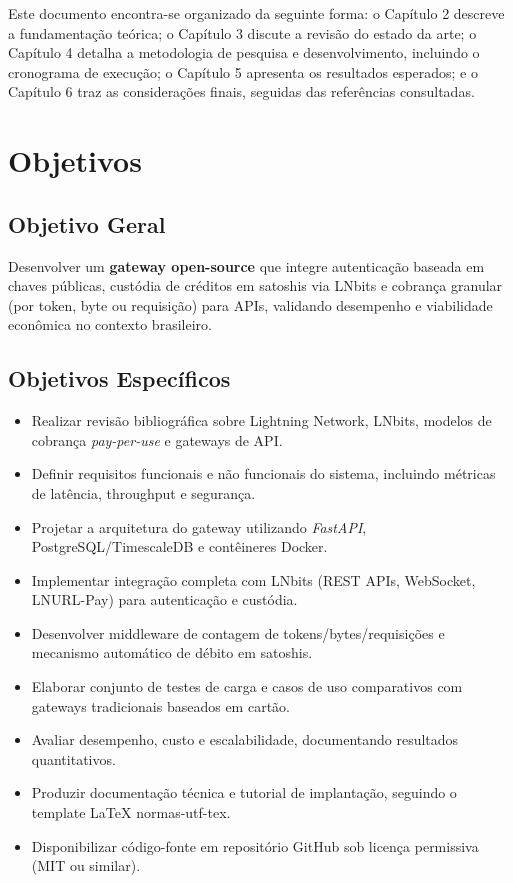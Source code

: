 \documentclass[openright]{normas-utf-tex}
\begin{document}
Este documento encontra-se organizado da seguinte forma: o Capítulo 2 descreve a fundamentação teórica; o Capítulo 3 discute a revisão do estado da arte; o Capítulo 4 detalha a metodologia de pesquisa e desenvolvimento, incluindo o cronograma de execução; o Capítulo 5 apresenta os resultados esperados; e o Capítulo 6 traz as considerações finais, seguidas das referências consultadas.

\section{Objetivos}

\subsection{Objetivo Geral}
Desenvolver um \textbf{gateway open-source} que integre autenticação baseada em chaves públicas, custódia de créditos em satoshis via LNbits e cobrança granular (por token, byte ou requisição) para APIs, validando desempenho e viabilidade econômica no contexto brasileiro.

\subsection{Objetivos Específicos}
\begin{itemize}
\item Realizar revisão bibliográfica sobre Lightning Network, LNbits, modelos de cobrança \textit{pay-per-use} e gateways de API.
\item Definir requisitos funcionais e não funcionais do sistema, incluindo métricas de latência, throughput e segurança.
\item Projetar a arquitetura do gateway utilizando \textit{FastAPI}, PostgreSQL/TimescaleDB e contêineres Docker.
\item Implementar integração completa com LNbits (REST APIs, WebSocket, LNURL-Pay) para autenticação e custódia.
\item Desenvolver middleware de contagem de tokens/bytes/requisições e mecanismo automático de débito em satoshis.
\item Elaborar conjunto de testes de carga e casos de uso comparativos com gateways tradicionais baseados em cartão.
\item Avaliar desempenho, custo e escalabilidade, documentando resultados quantitativos.
\item Produzir documentação técnica e tutorial de implantação, seguindo o template LaTeX normas-utf-tex.
\item Disponibilizar código-fonte em repositório GitHub sob licença permissiva (MIT ou similar).
\end{itemize}
\end{document}
